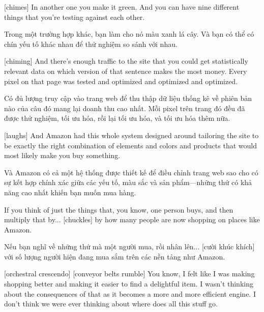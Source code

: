 \documentclass[a4paper]{article}
\begin{document}
	[chimes]
	In another one you make it green. And you can have nine different things that you're testing against each other.
	
	\begin{vietnamese-v2}
		Trong một trường hợp khác, bạn làm cho nó màu xanh lá cây. Và bạn có thể có chín yếu tố khác nhau để thử nghiệm so sánh với nhau.
	\end{vietnamese-v2}
	
	[chiming]
	And there's enough traffic to the site that you could get statistically relevant data on which version of that sentence makes the most money.
	Every pixel on that page was tested and optimized and optimized and optimized.
	
	\begin{vietnamese-v2}
		Có đủ lượng truy cập vào trang web để thu thập dữ liệu thống kê về phiên bản nào của câu đó mang lại doanh thu cao nhất. Mỗi pixel trên trang đó đều đã được thử nghiệm, tối ưu hóa, rồi lại tối ưu hóa, và tối ưu hóa thêm nữa.
	\end{vietnamese-v2}
	
	[laughs] And Amazon had this whole system designed around tailoring the site to be exactly the right combination of elements and colors and products that would most likely make you buy something.
	
	\begin{vietnamese-v2}
		[cười] Và Amazon có cả một hệ thống được thiết kế để điều chỉnh trang web sao cho có sự kết hợp chính xác giữa các yếu tố, màu sắc và sản phẩm—những thứ có khả năng cao nhất khiến bạn muốn mua hàng.
	\end{vietnamese-v2}
	
	
	If you think of just the things that, you know, one person buys, and then multiply that by... [chuckles] by how many people are now shopping on places like Amazon.
	
	\begin{vietnamese-v2}
		Nếu bạn nghĩ về những thứ mà một người mua, rồi nhân lên... [cười khúc khích] với số lượng người hiện đang mua sắm trên các nền tảng như Amazon.
	\end{vietnamese-v2}
	
	[orchestral crescendo]
	[conveyor belts rumble]
	You know, I felt like I was making shopping better and making it easier to find a delightful item.
	I wasn't thinking about the consequences of that as it becomes a more and more efficient engine.
	I don't think we were ever thinking about where does all this stuff go.
	
\end{document}
